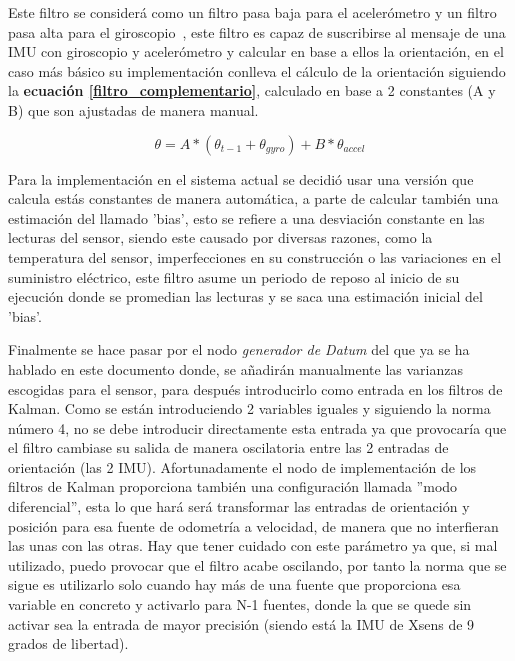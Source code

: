 Este filtro se considerá como un filtro pasa baja para el acelerómetro y un filtro pasa alta para el giroscopio~\cite{sanchez2018algoritmo}, este filtro es capaz de suscribirse al mensaje de una IMU con giroscopio y acelerómetro y calcular en base a ellos la orientación, en el caso más básico su implementación 
conlleva el cálculo de la orientación siguiendo la \textbf{ecuación \ref{filtro_complementario}}, calculado en base a 2 constantes (A y B) que son ajustadas de manera manual.

\begin{equation}\label{filtro_complementario}
  \theta = A * (\theta_{t - 1} + \theta_{gyro} ) + B * \theta_{accel}
\end{equation}

Para la implementación en el sistema actual se decidió usar una versión que calcula estás constantes de manera automática, a parte de calcular 
también una estimación del llamado 'bias', esto se refiere a una desviación constante en las lecturas del sensor, siendo este causado por diversas razones, como la
temperatura del sensor, imperfecciones en su construcción o las variaciones en el suministro eléctrico, este filtro asume un periodo de reposo al inicio de su ejecución donde se promedian las lecturas 
y se saca una estimación inicial del 'bias'.

Finalmente se hace pasar por el nodo \textit{generador de Datum} del que ya se ha hablado en este documento donde, se añadirán manualmente las varianzas 
escogidas para el sensor, para después introducirlo como entrada en los filtros de Kalman. Como se están introduciendo 2 variables iguales y siguiendo 
la norma número 4, no se debe introducir directamente esta entrada ya que provocaría que el filtro cambiase su salida de manera oscilatoria 
entre las 2 entradas de orientación (las 2 IMU). Afortunadamente el nodo de implementación de los filtros de Kalman proporciona también una 
configuración llamada ''modo diferencial'', esta lo que hará será transformar las entradas de orientación y posición para esa fuente de odometría a 
velocidad, de manera que no interfieran las unas con las otras. Hay que tener cuidado con este parámetro ya que, si mal utilizado, puedo provocar que el filtro 
acabe oscilando, por tanto la norma que se sigue es utilizarlo solo cuando hay más de una fuente que proporciona esa variable en concreto y activarlo para N-1 fuentes, 
donde la que se quede sin activar sea la entrada de mayor precisión (siendo está la IMU de Xsens de 9 grados de libertad).


